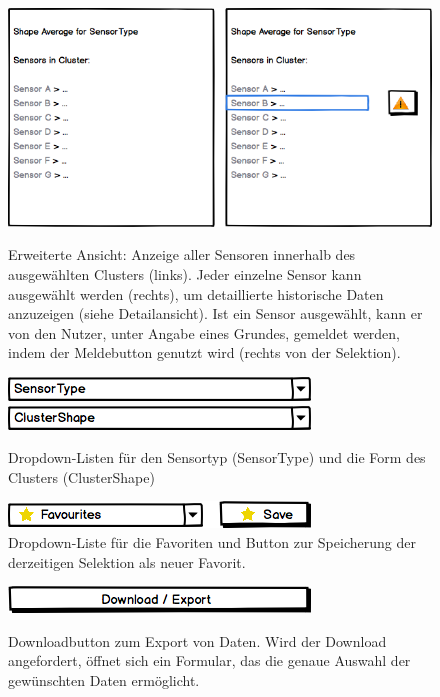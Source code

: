 \begin{figure}[H]
	\centering
		\includegraphics[width=0.8\linewidth]{gui/frontend/FrontGUISensorListAloneAndWithSelection.png}\\
	\caption{Erweiterte Ansicht: Anzeige aller Sensoren innerhalb des ausgewählten Clusters (links). Jeder einzelne Sensor kann ausgewählt werden (rechts), um detaillierte historische Daten anzuzeigen (siehe Detailansicht). Ist ein Sensor ausgewählt, kann er von den Nutzer, unter Angabe eines Grundes, gemeldet werden, indem der Meldebutton genutzt wird (rechts von der Selektion).}
\end{figure}

\begin{figure}[H]
	\centering
	\includegraphics[width=0.4\linewidth]{gui/frontend/FrontGUISensorType.png}
	\hspace{0.1cm}
	\includegraphics[width=0.4\linewidth]{gui/frontend/FrontGUIShapeType.png}
	\caption{Dropdown-Listen für den Sensortyp (SensorType) und die Form des Clusters (ClusterShape)}
\end{figure}

\begin{figure}[H]
	\centering
	\includegraphics[width=0.4\linewidth]{gui/frontend/FrontGUIFavourites.png}
	\caption{Dropdown-Liste für die Favoriten und Button zur Speicherung der derzeitigen Selektion als neuer Favorit.}
\end{figure}

\begin{figure}[H]
	\centering
	\includegraphics[width=0.4\linewidth]{gui/frontend/FrontGUIDownloadButton.png}\\
	\caption{Downloadbutton zum Export von Daten. Wird der Download angefordert, öffnet sich ein Formular, das die genaue Auswahl der gewünschten Daten ermöglicht.}
\end{figure}

